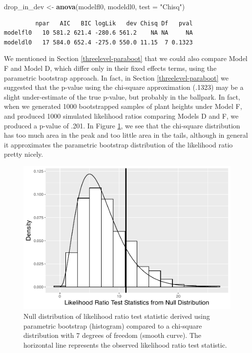 \documentclass[
]{krantz}
\newenvironment{Shaded}{\begin{snugshade}}{\end{snugshade}}
\newcommand{\DataTypeTok}[1]{\textcolor[rgb]{0.27,0.27,0.27}{#1}}
\newcommand{\KeywordTok}[1]{\textcolor[rgb]{0.27,0.27,0.27}{\textbf{#1}}}
\newcommand{\NormalTok}[1]{#1}
\newcommand{\StringTok}[1]{\textcolor[rgb]{0.5,0.5,0.5}{#1}}
\begin{document}
\begin{Shaded}
\begin{Highlighting}[]
\NormalTok{drop_in_dev <-}\StringTok{ }\KeywordTok{anova}\NormalTok{(modelfl0, modeldl0, }\DataTypeTok{test =} \StringTok{"Chisq"}\NormalTok{)}
\end{Highlighting}
\end{Shaded}

\begin{verbatim}
         npar   AIC   BIC logLik   dev Chisq Df   pval
modelfl0   10 581.2 621.4 -280.6 561.2    NA NA     NA
modeldl0   17 584.0 652.4 -275.0 550.0 11.15  7 0.1323
\end{verbatim}

We mentioned in Section \ref{threelevel-paraboot} that we could also compare Model F and Model D, which differ only in their fixed effects terms, using the parametric bootstrap approach. In fact, in Section \ref{threelevel-paraboot} we suggested that the p-value using the chi-square approximation (.1323) may be a slight under-estimate of the true p-value, but probably in the ballpark. In fact, when we generated 1000 bootstrapped samples of plant heights under Model F, and produced 1000 simulated likelihood ratios comparing Models D and F, we produced a p-value of .201. In Figure \ref{fig:parabootDF}, we see that the chi-square distribution has too much area in the peak and too little area in the tails, although in general it approximates the parametric bootstrap distribution of the likelihood ratio pretty nicely.

\begin{figure}

{\centering \includegraphics[width=0.6\linewidth]{bookdown-BeyondMLR_files/figure-latex/parabootDF-1} 

}

\caption{Null distribution of likelihood ratio test statistic derived using parametric bootstrap (histogram) compared to a chi-square distribution with 7 degrees of freedom (smooth curve).  The horizontal line represents the observed likelihood ratio test statistic.}\label{fig:parabootDF}
\end{figure}
\end{document}
